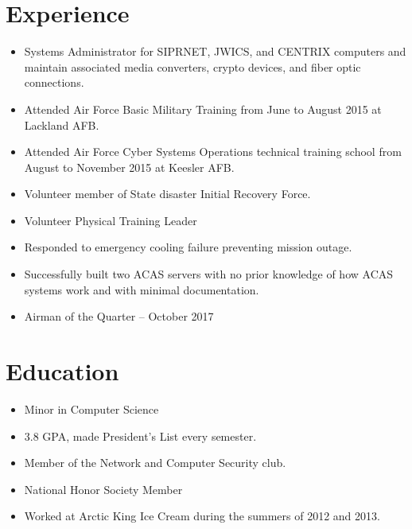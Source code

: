 \documentclass[11pt]{resume}
\author{Seth Sevier}
\begin{document}
\maketitle

\section{Experience}

\begin{itemize}
\item Systems Administrator for SIPRNET, JWICS, and CENTRIX computers and maintain associated media converters, crypto devices, and fiber optic connections.
\item Attended Air Force Basic Military Training from June to August 2015 at Lackland AFB.
\item Attended Air Force Cyber Systems Operations technical training school from August to November 2015 at Keesler AFB.
\item Volunteer member of State disaster Initial Recovery Force.
\item Volunteer Physical Training Leader
\item Responded to emergency cooling failure preventing mission outage.
\item Successfully built two ACAS servers with no prior knowledge of how ACAS systems work and with minimal documentation.
\item Airman of the Quarter -- October 2017
\end{itemize}

\section{Education}

\begin{itemize}
\item Minor in Computer Science
\item 3.8 GPA, made President's List every semester.
\item Member of the Network and Computer Security club.
\end{itemize}

\begin{itemize}
\item National Honor Society Member
\item Worked at Arctic King Ice Cream during the summers of 2012 and 2013.
\end{itemize}
\end{document}
